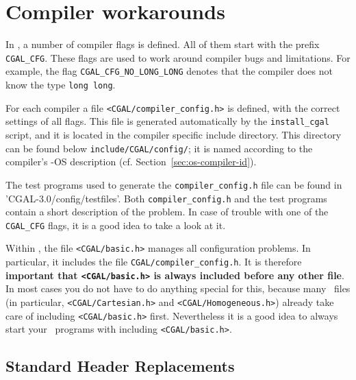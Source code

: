 \section{Compiler workarounds}

In \cgal, a number of compiler flags is defined. All of them start
with the prefix \texttt{CGAL\_CFG}. These flags are used to work
around compiler bugs and limitations. For example, the flag
\texttt{CGAL\_CFG\_NO\_LONG\_LONG} denotes that the compiler does not
know the type \texttt{long long}.

For each compiler a file \texttt{<CGAL/compiler\_config.h>}
 is defined, with the correct
settings of all flags. This file is generated automatically by the
\texttt{install\_cgal} script, and it is located in the compiler
specific include directory. This directory can be found below
\texttt{include/CGAL/config/};
 it is named according to the compiler's \cgal-OS
description (cf. Section~\ref{sec:os-compiler-id}).

The test programs used to generate the \texttt{compiler\_config.h}
file can be found in \nonlinkedpath'CGAL-3.0/config/testfiles'.
 Both
\texttt{compiler\_config.h} and the test programs contain a short
description of the problem. In case of trouble with one of the
\texttt{CGAL\_CFG} flags, it is a good idea to take a look at it.

Within \cgal, the file \texttt{<CGAL/basic.h>}
 manages all configuration problems. In
particular, it includes the file \texttt{CGAL/compiler\_config.h}. It
is therefore \textbf{important that \texttt{<CGAL/basic.h>} is always
  included before any other file}. In most cases you do not have to do
anything special for this, because many \cgal\ files (in particular,
\texttt{<CGAL/Cartesian.h>} and \texttt{<CGAL/Homogeneous.h>}) already
take care of including \texttt{<CGAL/basic.h>} first. Nevertheless it
is a good idea to always start your \cgal\ programs with including
\texttt{<CGAL/basic.h>}.

\subsection{Standard Header Replacements}

